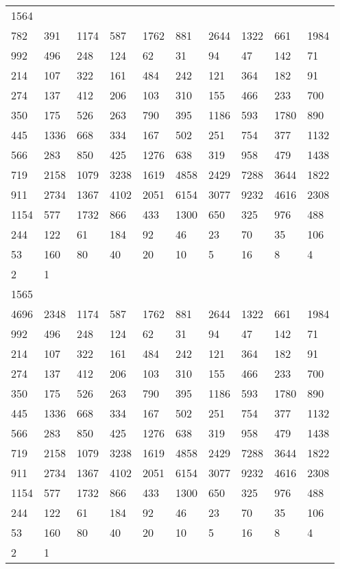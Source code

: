 \begin{longtable}{*{10}{l}}
1564&&&&&&&&&\\
782& 391& 1174& 587& 1762& 881& 2644& 1322& 661& 1984\\
992& 496& 248& 124& 62& 31& 94& 47& 142& 71\\
214& 107& 322& 161& 484& 242& 121& 364& 182& 91\\
274& 137& 412& 206& 103& 310& 155& 466& 233& 700\\
350& 175& 526& 263& 790& 395& 1186& 593& 1780& 890\\
445& 1336& 668& 334& 167& 502& 251& 754& 377& 1132\\
566& 283& 850& 425& 1276& 638& 319& 958& 479& 1438\\
719& 2158& 1079& 3238& 1619& 4858& 2429& 7288& 3644& 1822\\
911& 2734& 1367& 4102& 2051& 6154& 3077& 9232& 4616& 2308\\
1154& 577& 1732& 866& 433& 1300& 650& 325& 976& 488\\
244& 122& 61& 184& 92& 46& 23& 70& 35& 106\\
53& 160& 80& 40& 20& 10& 5& 16& 8& 4\\
2& 1& \\

1565&&&&&&&&&\\
4696& 2348& 1174& 587& 1762& 881& 2644& 1322& 661& 1984\\
992& 496& 248& 124& 62& 31& 94& 47& 142& 71\\
214& 107& 322& 161& 484& 242& 121& 364& 182& 91\\
274& 137& 412& 206& 103& 310& 155& 466& 233& 700\\
350& 175& 526& 263& 790& 395& 1186& 593& 1780& 890\\
445& 1336& 668& 334& 167& 502& 251& 754& 377& 1132\\
566& 283& 850& 425& 1276& 638& 319& 958& 479& 1438\\
719& 2158& 1079& 3238& 1619& 4858& 2429& 7288& 3644& 1822\\
911& 2734& 1367& 4102& 2051& 6154& 3077& 9232& 4616& 2308\\
1154& 577& 1732& 866& 433& 1300& 650& 325& 976& 488\\
244& 122& 61& 184& 92& 46& 23& 70& 35& 106\\
53& 160& 80& 40& 20& 10& 5& 16& 8& 4\\
2& 1& \\


\end{longtable}
